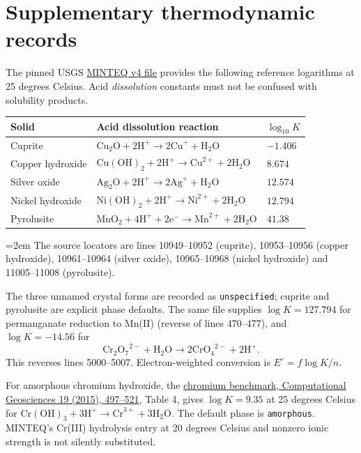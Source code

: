 \documentclass[a4paper,11pt]{ltxdoc}
\begin{document}
\section{Supplementary thermodynamic records}
The pinned USGS \href{https://github.com/usgs-coupled/phreeqc3/blob/b0b3be767158ccc3322d2c816625cf470045e67e/database/minteq.v4.dat}{MINTEQ v4 file}
provides the following reference logarithms at 25 degrees Celsius. Acid
\emph{dissolution} constants must not be confused with solubility products.
\begin{center}\small
\begin{tabular}{lll}
Solid & Acid dissolution reaction & $\log_{10}K$\\\hline
Cuprite & $\mathrm{Cu_2O}+2\mathrm H^+\to2\mathrm{Cu}^++\mathrm{H_2O}$ & $-1.406$\\
Copper hydroxide & $\mathrm{Cu(OH)_2}+2\mathrm H^+\to\mathrm{Cu}^{2+}+2\mathrm{H_2O}$ & $8.674$\\
Silver oxide & $\mathrm{Ag_2O}+2\mathrm H^+\to2\mathrm{Ag}^++\mathrm{H_2O}$ & $12.574$\\
Nickel hydroxide & $\mathrm{Ni(OH)_2}+2\mathrm H^+\to\mathrm{Ni}^{2+}+2\mathrm{H_2O}$ & $12.794$\\
Pyrolusite & $\mathrm{MnO_2}+4\mathrm H^++2\mathrm e^-\to\mathrm{Mn}^{2+}+2\mathrm{H_2O}$ & $41.38$
\end{tabular}\end{center}
{\emergencystretch=2em
The source locators are lines 10949--10952 (cuprite),
10953--10956 (copper hydroxide), 10961--10964 (silver oxide),
10965--10968 (nickel hydroxide) and 11005--11008 (pyrolusite).\par}
The three unnamed crystal forms are recorded as
\texttt{unspecified}; cuprite and pyrolusite are explicit phase defaults.
The same file supplies $\log K=127.794$ for permanganate reduction to Mn(II)
(reverse of lines 470--477), and $\log K=-14.56$ for
\[\mathrm{Cr_2O_7}^{2-}+\mathrm{H_2O}\to2\mathrm{CrO_4}^{2-}+2\mathrm H^+.\]
This reverses lines 5000--5007. Electron-weighted conversion is $E^\circ=f\log K/n$.

For amorphous chromium hydroxide, the
\href{https://boris-portal.unibe.ch/server/api/core/bitstreams/f01d2d61-ad0e-4baa-b1ac-ccaa870866df/content}{chromium benchmark, Computational Geosciences 19 (2015), 497--521},
Table 4, gives $\log K=9.35$ at 25 degrees Celsius for
$\mathrm{Cr(OH)_3}+3\mathrm H^+\to\mathrm{Cr}^{3+}+3\mathrm{H_2O}$.
The default phase is \texttt{amorphous}. MINTEQ's Cr(III) hydrolysis entry at
20 degrees Celsius and nonzero ionic strength is not silently substituted.
\end{document}
